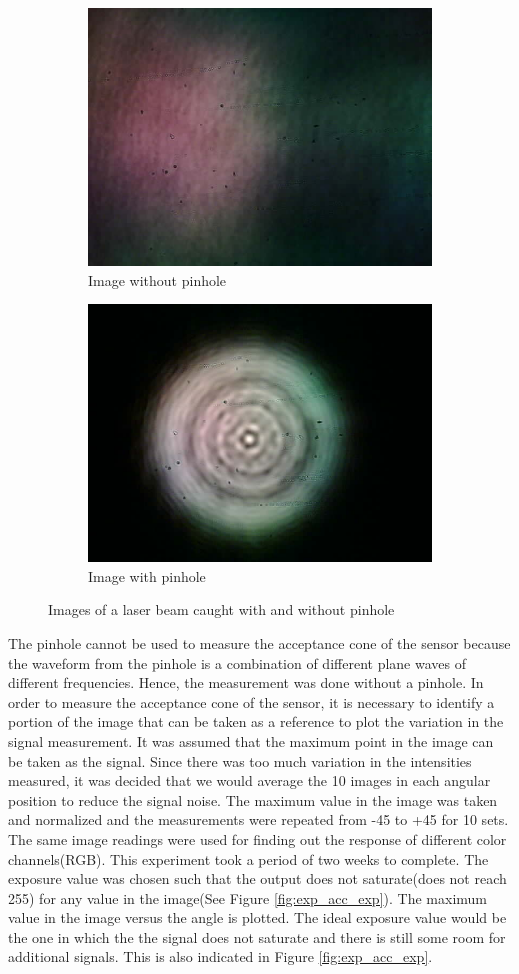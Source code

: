 \begin{figure}[ht]
    \centering
    \begin{subfigure}{0.5\textwidth}
    \centering
        \includegraphics[width=0.5\linewidth]{pics/withoutPinhole.jpg}
        \caption{Image without pinhole}
        \label{fig:nopinhole}
    \end{subfigure}%
    \begin{subfigure}{0.5\textwidth}
    \centering
        \includegraphics[width=0.5\linewidth]{pics/withPinhole.jpg}
        \caption{Image with pinhole}
        \label{fig:pinhole}
    \end{subfigure}
    \caption{Images of a laser beam caught with and without pinhole}
    \label{fig:pinholeDiff}
    \end{figure}
The pinhole cannot be used to measure the acceptance cone of the sensor because the waveform from the pinhole is a combination of different plane waves of different frequencies. Hence, the measurement was done without a pinhole. In order to measure the acceptance cone of the sensor, it is necessary to identify a portion of the image that can be taken as a reference to plot the variation in the signal measurement. It was assumed that the maximum point in the image can be taken as the signal. Since there was too much variation in the intensities measured, it was decided that we would average the 10 images in each angular position to reduce the signal noise. The maximum value in the image was taken and normalized and the measurements were repeated from -45 to +45 for 10 sets. The same image readings were used for finding out the response of different color channels(RGB). This experiment took a period of two weeks to complete. The exposure value was chosen such that the output does not saturate(does not reach 255) for any value in the image(See Figure \ref{fig:exp_acc_exp}). The maximum value in the image versus the angle is plotted. The ideal exposure value would be the one in which the the signal does not saturate and there is still some room for additional signals. This is also indicated in Figure \ref{fig:exp_acc_exp}.

